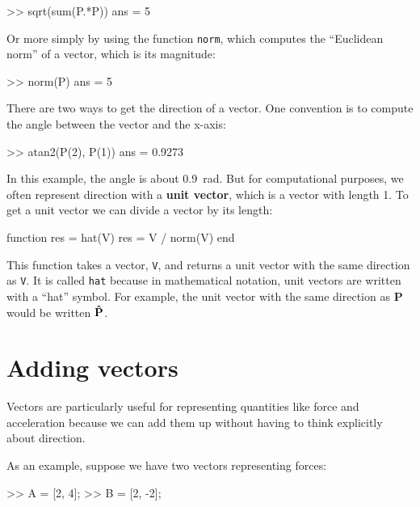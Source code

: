\documentclass[
]{book}
\numberwithin{Answer}{chapter}
\numberwithin{Exercise}{chapter}
\renewcommand{\vec}[1]{\bm{\mathbf{#1}}}
\newcommand{\uveci}{{\bm{\hat{\textnormal{\bfseries\i}}}}}
\newcommand{\uvecj}{{\bm{\hat{\textnormal{\bfseries\j}}}}}
\newcommand{\uvec}[1]{%
    \ifthenelse{\equal{#1}{i}}%
        {\uveci}{%
    \ifthenelse{\equal{#1}{j}}%
        {\uvecj}{%
    {\bm{\hat{\mathbf{#1}}}}%
}}}
\begin{document}
\begin{code}
>> sqrt(sum(P.*P))
ans = 5
\end{code}

Or more simply by using the function {\tt norm}, which computes the
``Euclidean norm'' of a vector, which is its magnitude:


\begin{code}
>> norm(P)
ans = 5
\end{code}

There are two ways to get the direction of a vector.  One convention is to compute the angle between the vector and the x-axis:

\begin{code}
>> atan2(P(2), P(1))
ans = 0.9273
\end{code}

In this example, the angle is about \SI{0.9}{\radian}.  But for computational purposes, we often represent direction with a {\bf unit vector}, which is a vector with length 1.  To get a unit vector we can divide a vector by its length:

\begin{code}
function res = hat(V)
    res = V / norm(V)
end
\end{code}
 
This function takes a vector, {\tt V}, and returns a unit vector with the same direction as {\tt V}.  It is called {\tt hat} because in mathematical notation, unit vectors are written with a ``hat'' symbol.  
For example, the unit vector with the same direction as $\vec{P}$ would be written $\uvec{P}$. 


\section{Adding vectors}

Vectors are particularly useful for representing quantities like force and acceleration because we can add them up without having to think explicitly about direction.


As an example, suppose we have two vectors representing forces:

\begin{code}
>> A = [2, 4];
>> B = [2, -2];
\end{code}
\end{document}
